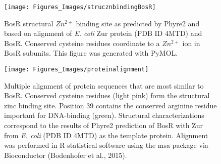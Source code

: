 \documentclass[12pt,twoside]{reedthesis}
\begin{document}
		 		 	\begin{figure}[h]
		 		 		
		 		 		\centering
		 		 		\texttt{[image: Figures\_Images/strucznbindingBosR]}
		 		 		\caption[BosR Structural $Zn^{2+}$ Binding Site]{BosR structural $Zn^{2+}$ binding site as predicted by Phyre2 and based on alignment of \textit{E. coli} Zur protein (PDB ID 4MTD) and BosR. Conserved cysteine residues coordinate to a $Zn^{2+}$ ion in BosR subunits. This figure was generated with PyMOL.}
		 		 		\label{StrucZnBosR}
		 		 	\end{figure}
		 		 	
		 	
		
		\clearpage
		 
		 		 	\begin{figure}[h]
		 		 		
		 		 		\centering
		 		 		\texttt{[image: Figures\_Images/proteinalignment]}
		 		 		\caption[BosR Protein Multiple Alignment]{Multiple alignment of protein sequences that are most similar to BosR. Conserved cysteine residues (light pink) form the structural zinc binding site. Position 39 contains the conserved arginine residue important for DNA-binding (green). Structural characterizations correspond to the results of Phyre2 prediction of BosR with Zur from \textit{E. coli} (PDB ID 4MTD) as the template protein. Alignment was performed in R statistical software using the msa package via Bioconductor (Bodenhofer et al., 2015). } 
		 		 		\label{Alignnment}
		 		 	\end{figure}
		 		 	
\end{document}
